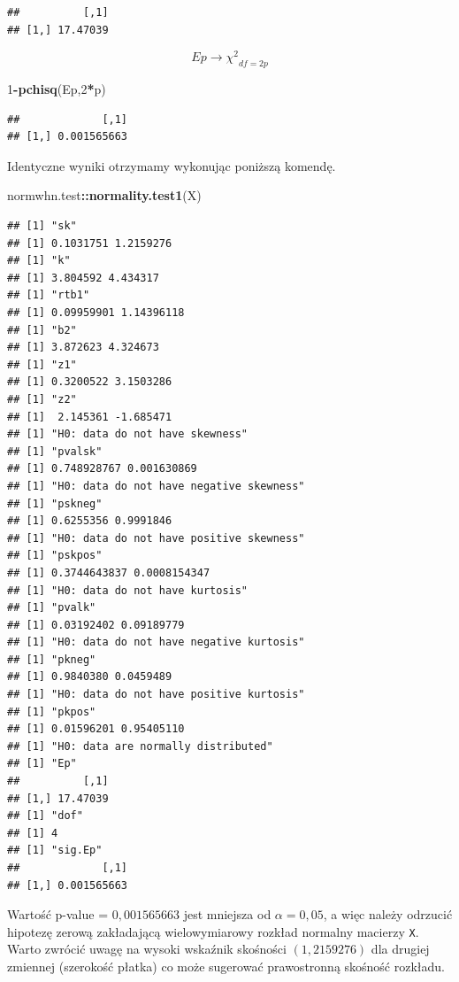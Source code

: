 \documentclass[polish,]{book}
\newenvironment{Shaded}{\begin{snugshade}}{\end{snugshade}}
\newcommand{\DecValTok}[1]{\textcolor[rgb]{0.00,0.00,0.81}{#1}}
\newcommand{\KeywordTok}[1]{\textcolor[rgb]{0.13,0.29,0.53}{\textbf{#1}}}
\newcommand{\NormalTok}[1]{#1}
\newcommand{\OperatorTok}[1]{\textcolor[rgb]{0.81,0.36,0.00}{\textbf{#1}}}
\begin{document}
\begin{verbatim}
##          [,1]
## [1,] 17.47039
\end{verbatim}

\begin{equation}
Ep\longrightarrow {{\chi}^{2}}_{df=2p}
\label{eq:wz1129}
\end{equation}

\begin{Shaded}
\begin{Highlighting}[]
\DecValTok{1}\OperatorTok{-}\KeywordTok{pchisq}\NormalTok{(Ep,}\DecValTok{2}\OperatorTok{*}\NormalTok{p)}
\end{Highlighting}
\end{Shaded}

\begin{verbatim}
##             [,1]
## [1,] 0.001565663
\end{verbatim}

Identyczne wyniki otrzymamy wykonując poniższą komendę.

\begin{Shaded}
\begin{Highlighting}[]
\NormalTok{normwhn.test}\OperatorTok{::}\KeywordTok{normality.test1}\NormalTok{(X)}
\end{Highlighting}
\end{Shaded}

\begin{verbatim}
## [1] "sk"
## [1] 0.1031751 1.2159276
## [1] "k"
## [1] 3.804592 4.434317
## [1] "rtb1"
## [1] 0.09959901 1.14396118
## [1] "b2"
## [1] 3.872623 4.324673
## [1] "z1"
## [1] 0.3200522 3.1503286
## [1] "z2"
## [1]  2.145361 -1.685471
## [1] "H0: data do not have skewness"
## [1] "pvalsk"
## [1] 0.748928767 0.001630869
## [1] "H0: data do not have negative skewness"
## [1] "pskneg"
## [1] 0.6255356 0.9991846
## [1] "H0: data do not have positive skewness"
## [1] "pskpos"
## [1] 0.3744643837 0.0008154347
## [1] "H0: data do not have kurtosis"
## [1] "pvalk"
## [1] 0.03192402 0.09189779
## [1] "H0: data do not have negative kurtosis"
## [1] "pkneg"
## [1] 0.9840380 0.0459489
## [1] "H0: data do not have positive kurtosis"
## [1] "pkpos"
## [1] 0.01596201 0.95405110
## [1] "H0: data are normally distributed"
## [1] "Ep"
##          [,1]
## [1,] 17.47039
## [1] "dof"
## [1] 4
## [1] "sig.Ep"
##             [,1]
## [1,] 0.001565663
\end{verbatim}

Wartość p-value = \(0,001565663\) jest mniejsza od \(\alpha = 0,05\), a więc należy odrzucić
hipotezę zerową zakładającą wielowymiarowy rozkład normalny macierzy \texttt{X}. Warto zwrócić uwagę na wysoki wskaźnik skośności \((1,2159276)\) dla drugiej zmiennej
(szerokość płatka) co może sugerować prawostronną skośność rozkładu.
\end{document}

